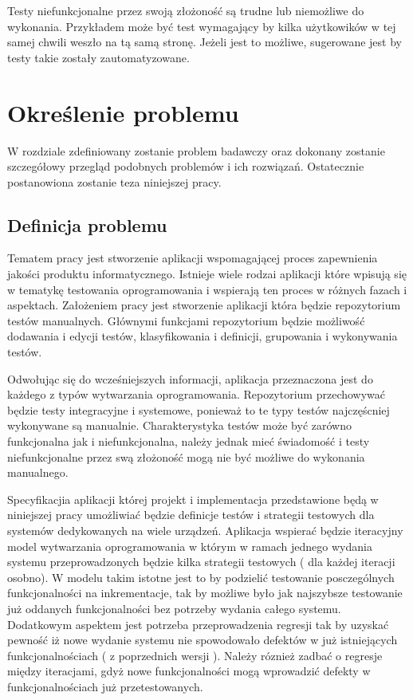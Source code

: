 Testy niefunkcjonalne przez swoją złożoność są trudne lub niemożliwe do wykonania. Przykładem może być test wymagający by kilka użytkowików w tej samej chwili weszło na tą samą stronę. Jeżeli jest to możliwe, sugerowane jest by testy takie zostały zautomatyzowane.
\chapter{Określenie problemu} %
\label{cha:okreslenie_problemu}

W rozdziale zdefiniowany zostanie problem badawczy oraz dokonany zostanie szczegółowy przegląd  podobnych problemów i ich rozwiązań. Ostatecznie postanowiona zostanie teza niniejszej pracy.

\section{Definicja problemu} %
\label{sec:definicja_problemu}

Tematem pracy jest stworzenie aplikacji wspomagającej proces zapewnienia jakości produktu informatycznego. Istnieje wiele rodzai aplikacji które wpisują się w tematykę testowania oprogramowania i wspierają ten proces w różnych fazach i aspektach. Założeniem pracy jest stworzenie aplikacji która będzie repozytorium testów manualnych. Głównymi funkcjami repozytorium będzie możliwość dodawania i edycji testów, klasyfikowania i definicji, grupowania i wykonywania  testów.


Odwołując się do wcześniejszych informacji, aplikacja przeznaczona jest do każdego z typów wytwarzania oprogramowania. Repozytorium przechowywać będzie testy integracyjne i systemowe, ponieważ to te typy testów najczęścniej wykonywane są manualnie. Charakterystyka testów może być zarówno funkcjonalna jak i niefunkcjonalna, należy jednak mieć świadomość i testy niefunkcjonalne przez swą złożoność mogą nie być możliwe do wykonania manualnego.

Specyfikacjia aplikacji której projekt i implementacja przedstawione będą w niniejszej pracy umożliwiać będzie definicje testów i strategii testowych dla systemów dedykowanych na wiele urządzeń. Aplikacja wspierać będzie iteracyjny model wytwarzania oprogramowania w którym w ramach jednego wydania systemu przeprowadzonych będzie kilka strategii testowych ( dla każdej iteracji osobno). W modelu takim istotne jest to by podzielić testowanie posczególnych funkcjonalności na inkrementacje, tak by możliwe było jak najszybsze testowanie już oddanych funkcjonalności bez potrzeby wydania całego systemu. Dodatkowym aspektem jest potrzeba przeprowadzenia regresji tak by uzyskać pewność iż nowe wydanie systemu nie spowodowało defektów w już istniejących funkcjonalnościach ( z poprzednich wersji ). Należy róznież zadbać o regresje między iteracjami, gdyż nowe funkcjonalności mogą wprowadzić defekty w funkcjonalnościach już przetestowanych.

